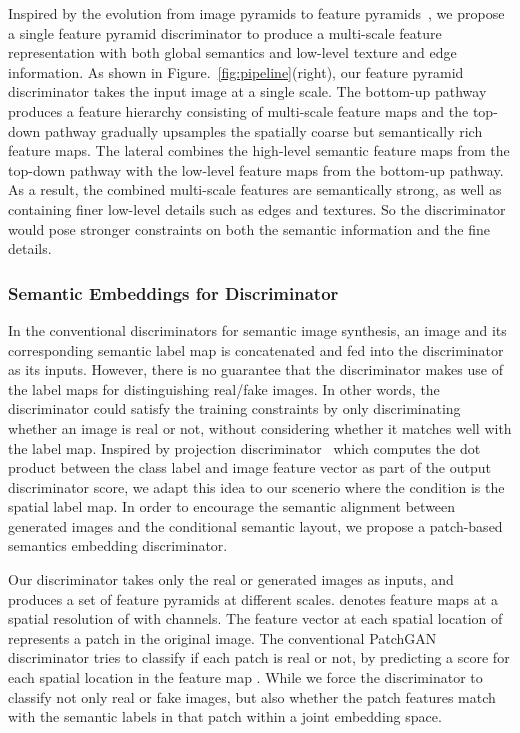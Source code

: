 \documentclass{article}
\begin{document}
Inspired by the evolution from image pyramids to feature pyramids~\cite{lin2017feature}, we propose a single feature pyramid discriminator to produce a multi-scale feature representation with both global semantics and low-level texture and edge information.
As shown in Figure.~\ref{fig:pipeline}(right), our feature pyramid discriminator takes the input image at a single scale.
The bottom-up pathway produces a feature hierarchy consisting of multi-scale feature maps and the top-down pathway gradually upsamples the spatially coarse but semantically rich feature maps.
The lateral combines the high-level semantic feature maps from the top-down pathway with the low-level feature maps from the bottom-up pathway. 
As a result, the combined multi-scale features are semantically strong, as well as containing finer low-level details such as edges and textures.
So the discriminator would pose stronger constraints on both the semantic information and the fine details. 

\subsubsection{Semantic Embeddings for Discriminator}
In the conventional discriminators for semantic image synthesis, an image and its corresponding semantic label map is concatenated and fed into the discriminator as its inputs.
However, there is no guarantee that the discriminator makes use of the label maps for distinguishing real/fake images.
In other words, the discriminator could satisfy the training constraints by only discriminating whether an image is real or not, without considering whether it matches well with the label map.
Inspired by projection discriminator~\cite{miyato2018cgans} which computes the dot product between the class label and image feature vector as part of the output discriminator score, we adapt this idea to our scenerio where the condition is the spatial label map.
In order to encourage the semantic alignment between generated images and the conditional semantic layout, we propose a patch-based semantics embedding discriminator.


Our discriminator takes only the real or generated images as inputs, and produces a set of feature pyramids  at different scales.
 denotes feature maps at a spatial resolution of  with  channels.
The feature vector at each spatial location of  represents a patch in the original image.
The conventional PatchGAN discriminator tries to classify if each patch is real or not, by predicting a score for each spatial location in the feature map .
While we force the discriminator to classify not only real or fake images, but also whether the patch features match with the semantic labels in that patch within a joint embedding space. 
\end{document}
